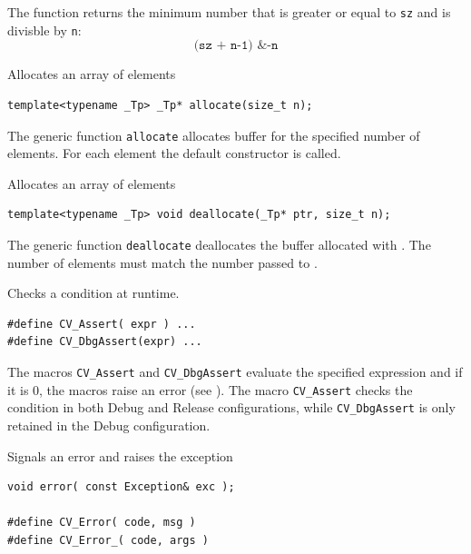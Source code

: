 The function returns the minimum number that is greater or equal to \texttt{sz} and is divisble by \texttt{n}:
\[\texttt{(sz + n-1) \& -n}\]


\label{allocate}
Allocates an array of elements

\begin{lstlisting}
template<typename _Tp> _Tp* allocate(size_t n);
\end{lstlisting}
\begin{description}
\end{description}

The generic function \texttt{allocate} allocates buffer for the specified number of elements. For each element the default constructor is called.


\label{allocate}
Allocates an array of elements

\begin{lstlisting}
template<typename _Tp> void deallocate(_Tp* ptr, size_t n);
\end{lstlisting}
\begin{description}
\end{description}

The generic function \texttt{deallocate} deallocates the buffer allocated with . The number of elements must match the number passed to .

\label{CV Assert}
Checks a condition at runtime.

\begin{lstlisting}
#define CV_Assert( expr ) ...
#define CV_DbgAssert(expr) ...
\end{lstlisting}

\begin{description}
\end{description}

The macros \texttt{CV\_Assert} and \texttt{CV\_DbgAssert} evaluate the specified expression and if it is 0, the macros raise an error (see ). The macro \texttt{CV\_Assert} checks the condition in both Debug and Release configurations, while \texttt{CV\_DbgAssert} is only retained in the Debug configuration.

\label{error}
Signals an error and raises the exception

\begin{lstlisting}
void error( const Exception& exc );

#define CV_Error( code, msg )
#define CV_Error_( code, args )
\end{lstlisting}
\begin{description}
\end{description}

